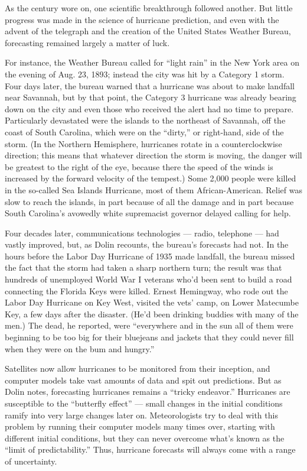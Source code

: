 As the century wore on, one scientific breakthrough followed another.
But little progress was made in the science of hurricane prediction, and
even with the advent of the telegraph and the creation of the United
States Weather Bureau, forecasting remained largely a matter of luck.

For instance, the Weather Bureau called for ``light rain'' in the New
York area on the evening of Aug. 23, 1893; instead the city was hit by a
Category 1 storm. Four days later, the bureau warned that a hurricane
was about to make landfall near Savannah, but by that point, the
Category 3 hurricane was already bearing down on the city and even those
who received the alert had no time to prepare. Particularly devastated
were the islands to the northeast of Savannah, off the coast of South
Carolina, which were on the ``dirty,'' or right-hand, side of the storm.
(In the Northern Hemisphere, hurricanes rotate in a counterclockwise
direction; this means that whatever direction the storm is moving, the
danger will be greatest to the right of the eye, because there the speed
of the winds is increased by the forward velocity of the tempest.) Some
2,000 people were killed in the so-called Sea Islands Hurricane, most of
them African-American. Relief was slow to reach the islands, in part
because of all the damage and in part because South Carolina's avowedly
white supremacist governor delayed calling for help.

Four decades later, communications technologies --- radio, telephone ---
had vastly improved, but, as Dolin recounts, the bureau's forecasts had
not. In the hours before the Labor Day Hurricane of 1935 made landfall,
the bureau missed the fact that the storm had taken a sharp northern
turn; the result was that hundreds of unemployed World War I veterans
who'd been sent to build a road connecting the Florida Keys were killed.
Ernest Hemingway, who rode out the Labor Day Hurricane on Key West,
visited the vets' camp, on Lower Matecumbe Key, a few days after the
disaster. (He'd been drinking buddies with many of the men.) The dead,
he reported, were ``everywhere and in the sun all of them were beginning
to be too big for their bluejeans and jackets that they could never fill
when they were on the bum and hungry.''

Satellites now allow hurricanes to be monitored from their inception,
and computer models take vast amounts of data and spit out predictions.
But as Dolin notes, forecasting hurricanes remains a ``tricky
endeavor.'' Hurricanes are susceptible to the ``butterfly effect'' ---
small changes in the initial conditions ramify into very large changes
later on. Meteorologists try to deal with this problem by running their
computer models many times over, starting with different initial
conditions, but they can never overcome what's known as the ``limit of
predictability.'' Thus, hurricane forecasts will always come with a
range of uncertainty.

